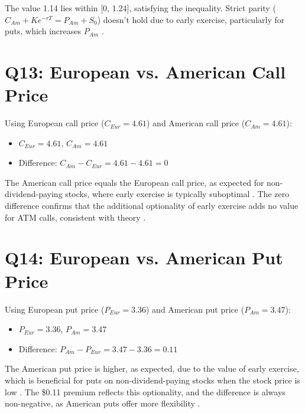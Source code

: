 \documentclass{article}
\begin{document}
The value 1.14 lies within [0, 1.24], satisfying the inequality. Strict parity ($C_{Am} + Ke^{-rT} = P_{Am} + S_0$) doesn’t hold due to early exercise, particularly for puts, which increases $P_{Am}$ \citep{hull2018options}.


\section*{Q13: European vs. American Call Price}

Using European call price ($C_{Eur} = 4.61$) and American call price ($C_{Am} = 4.61$):

\begin{itemize}
    \item $C_{Eur} = 4.61$, $C_{Am} = 4.61$
    \item Difference: $C_{Am} - C_{Eur} = 4.61 - 4.61 = 0$
\end{itemize}

The American call price equals the European call price, as expected for non-dividend-paying stocks, where early exercise is typically suboptimal \citep{hull2018options}. The zero difference confirms that the additional optionality of early exercise adds no value for ATM calls, consistent with theory \citep{shreve2004stochastic}.


\section*{Q14: European vs. American Put Price}

Using European put price ($P_{Eur} = 3.36$) and American put price ($P_{Am} = 3.47$):

\begin{itemize}
    \item $P_{Eur} = 3.36$, $P_{Am} = 3.47$
    \item Difference: $P_{Am} - P_{Eur} = 3.47 - 3.36 = 0.11$
\end{itemize}

The American put price is higher, as expected, due to the value of early exercise, which is beneficial for puts on non-dividend-paying stocks when the stock price is low \citep{hull2018options}. The \$0.11 premium reflects this optionality, and the difference is always non-negative, as American puts offer more flexibility \citep{shreve2004stochastic}.
\end{document}
